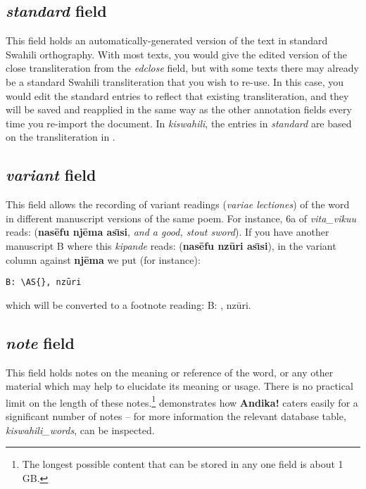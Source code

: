 \subsection{\textit{standard} field}

This field holds an automatically-generated version of the text in standard Swahili orthography.  With most texts, you would give the edited version of the close transliteration from the \textit{edclose} field, but with some texts there may already be a standard Swahili transliteration that you wish to re-use.  In this case, you would edit the standard entries to reflect that existing transliteration, and they will be saved and reapplied in the same way as the other annotation fields every time you re-import the document.  In \textit{kiswahili}, the entries in \textit{standard} are based on the transliteration in \citet{Abdulkadir2013}.


\subsection{\textit{variant} field}

This field allows the recording of variant readings (\textit{variae lectiones}) of the word in different manuscript versions of the same poem.  For instance, 6a of \textit{vita_vikuu} reads:  (\textbf{nasēfu njēma ası̄si}, \textit{and a good, stout sword}).  If you have another manuscript B where this \textit{kipande} reads:  (\textbf{nasēfu nzūri ası̄si}), in the variant column against \textbf{njēma} we put (for instance):

\verb|B: \AS{|\texttt{}\verb|}, nzūri|

which will be converted to a footnote reading: B: , nzūri.


\subsection{\textit{note} field}

This field holds notes on the meaning or reference of the word, or any other material which may help to elucidate its meaning or usage.  There is no practical limit on the length of these notes.\footnote{The longest possible content that can be stored in any one field is about 1 GB.}   demonstrates how \textbf{Andika!} caters easily for a significant number of notes -- for more information the relevant database table, \textit{kiswahili_words}, can be inspected.


